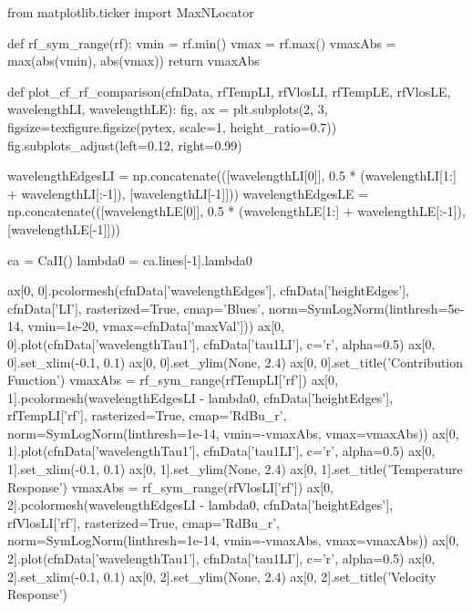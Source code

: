 \begin{pycode}[TimeDepRT]
from matplotlib.ticker import MaxNLocator

def rf_sym_range(rf):
    vmin = rf.min()
    vmax = rf.max()
    vmaxAbs = max(abs(vmin), abs(vmax))
    return vmaxAbs

def plot_cf_rf_comparison(cfnData, rfTempLI, rfVlosLI,
                          rfTempLE, rfVlosLE, wavelengthLI, wavelengthLE):
    fig, ax = plt.subplots(2, 3, figsize=texfigure.figsize(pytex, scale=1, height_ratio=0.7))
    fig.subplots_adjust(left=0.12, right=0.99)

    wavelengthEdgesLI = np.concatenate(([wavelengthLI[0]],
                                        0.5 * (wavelengthLI[1:] + wavelengthLI[:-1]),
                                        [wavelengthLI[-1]]))
    wavelengthEdgesLE = np.concatenate(([wavelengthLE[0]],
                                        0.5 * (wavelengthLE[1:] + wavelengthLE[:-1]),
                                        [wavelengthLE[-1]]))

    ca = CaII()
    lambda0 = ca.lines[-1].lambda0

    ax[0, 0].pcolormesh(cfnData['wavelengthEdges'], cfnData['heightEdges'], cfnData['LI'],
                        rasterized=True, cmap='Blues',
                        norm=SymLogNorm(linthresh=5e-14, vmin=1e-20, vmax=cfnData['maxVal']))
    ax[0, 0].plot(cfnData['wavelengthTau1'], cfnData['tau1LI'], c='r', alpha=0.5)
    ax[0, 0].set_xlim(-0.1, 0.1)
    ax[0, 0].set_ylim(None, 2.4)
    ax[0, 0].set_title('Contribution Function')
    vmaxAbs = rf_sym_range(rfTempLI['rf'])
    ax[0, 1].pcolormesh(wavelengthEdgesLI - lambda0, cfnData['heightEdges'], rfTempLI['rf'],
                        rasterized=True, cmap='RdBu_r',
                        norm=SymLogNorm(linthresh=1e-14, vmin=-vmaxAbs, vmax=vmaxAbs))
    ax[0, 1].plot(cfnData['wavelengthTau1'], cfnData['tau1LI'], c='r', alpha=0.5)
    ax[0, 1].set_xlim(-0.1, 0.1)
    ax[0, 1].set_ylim(None, 2.4)
    ax[0, 1].set_title('Temperature Response')
    vmaxAbs = rf_sym_range(rfVlosLI['rf'])
    ax[0, 2].pcolormesh(wavelengthEdgesLI - lambda0, cfnData['heightEdges'], rfVlosLI['rf'],
                        rasterized=True, cmap='RdBu_r',
                        norm=SymLogNorm(linthresh=1e-14, vmin=-vmaxAbs, vmax=vmaxAbs))
    ax[0, 2].plot(cfnData['wavelengthTau1'], cfnData['tau1LI'], c='r', alpha=0.5)
    ax[0, 2].set_xlim(-0.1, 0.1)
    ax[0, 2].set_ylim(None, 2.4)
    ax[0, 2].set_title('Velocity Response')


\end{pycode}
